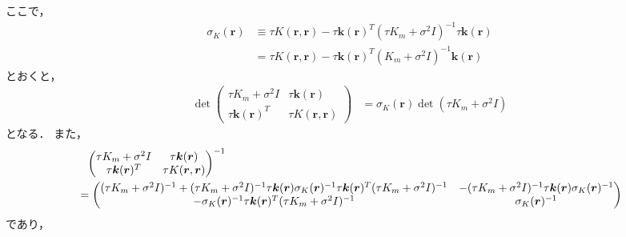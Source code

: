 ここで，
\begin{align}
    \sigma_K(\bm{r})
     & \equiv \tau K(\bm{r}, \bm{r})
    - \tau \bm{k}(\bm{r})^T (\tau K_m + \sigma^2 I)^{-1} \tau \bm{k}(\bm{r}) \\
     & = \tau K(\bm{r}, \bm{r})
    - \tau \bm{k}(\bm{r})^T (K_m + \sigma^2 I)^{-1} \bm{k}(\bm{r})
\end{align}
とおくと，
\begin{align}
    \det{
        \begin{pmatrix}
            \tau K_m + \sigma^2 I & \tau \bm{k}(\bm{r})    \\
            \tau \bm{k}(\bm{r})^T & \tau K(\bm{r}, \bm{r})
        \end{pmatrix}
    }
     & = \sigma_K(\bm{r}) \det(\tau K_m + \sigma^2 I)
\end{align}
となる．
また，
\begin{align}
     & \hphantom{=}
    \begin{pmatrix}
        \tau K_m + \sigma^2 I & \tau \bm{k}(\bm{r})    \\
        \tau \bm{k}(\bm{r})^T & \tau K(\bm{r}, \bm{r})
    \end{pmatrix}^{-1}
    \notag          \\
     & =
    \begin{pmatrix}
        (\tau K_m + \sigma^2 I)^{-1}
        + (\tau K_m + \sigma^2 I)^{-1} \tau \bm{k}(\bm{r}) \sigma_K(\bm{r})^{-1} \tau \bm{k}(\bm{r})^T (\tau K_m + \sigma^2 I)^{-1}
         &
        - (\tau K_m + \sigma^2 I)^{-1} \tau \bm{k}(\bm{r}) \sigma_K(\bm{r})^{-1}
        \\
        - \sigma_K(\bm{r})^{-1} \tau \bm{k}(\bm{r})^T (\tau K_m + \sigma^2 I)^{-1}
         &
        \sigma_K(\bm{r})^{-1}
    \end{pmatrix}
\end{align}
であり，
